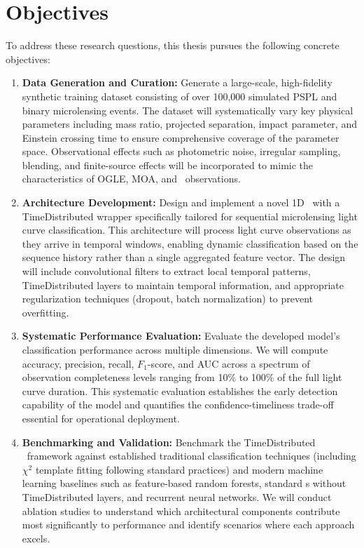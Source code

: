\section{Objectives}
\label{sec:objectives}

To address these research questions, this thesis pursues the following concrete objectives:

\begin{enumerate}
    \item \textbf{Data Generation and Curation:} Generate a large-scale, high-fidelity synthetic training dataset consisting of over 100,000 simulated PSPL and binary microlensing events. The dataset will systematically vary key physical parameters including mass ratio, projected separation, impact parameter, and Einstein crossing time to ensure comprehensive coverage of the parameter space. Observational effects such as photometric noise, irregular sampling, blending, and finite-source effects will be incorporated to mimic the characteristics of OGLE, MOA, and \lsst\ observations.
    
    \item \textbf{Architecture Development:} Design and implement a novel 1D \cnn\ with a TimeDistributed wrapper specifically tailored for sequential microlensing light curve classification. This architecture will process light curve observations as they arrive in temporal windows, enabling dynamic classification based on the sequence history rather than a single aggregated feature vector. The design will include convolutional filters to extract local temporal patterns, TimeDistributed layers to maintain temporal information, and appropriate regularization techniques (dropout, batch normalization) to prevent overfitting.
    
    \item \textbf{Systematic Performance Evaluation:} Evaluate the developed model's classification performance across multiple dimensions. We will compute accuracy, precision, recall, $F_1$-score, and AUC across a spectrum of observation completeness levels ranging from 10\% to 100\% of the full light curve duration. This systematic evaluation establishes the early detection capability of the model and quantifies the confidence-timeliness trade-off essential for operational deployment.
    
    \item \textbf{Benchmarking and Validation:} Benchmark the TimeDistributed \cnn\ framework against established traditional classification techniques (including $\chi^2$ template fitting following standard practices) and modern machine learning baselines such as feature-based random forests, standard \cnn s without TimeDistributed layers, and recurrent neural networks. We will conduct ablation studies to understand which architectural components contribute most significantly to performance and identify scenarios where each approach excels.
    

\end{enumerate}
